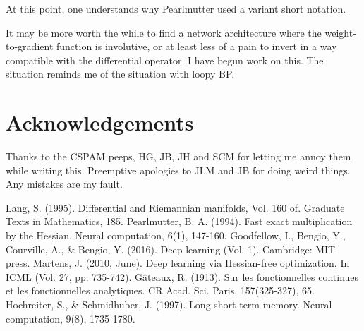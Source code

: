 \documentclass{article}
\begin{document}
At this point, one understands why Pearlmutter used a variant short notation.

It may be more worth the while to find a network architecture where the weight-to-gradient function is involutive, or at least less of a pain to invert in a way compatible with the differential operator. I have begun work on this. The situation reminds me of the situation with loopy BP.

\section{Acknowledgements}

Thanks to the CSPAM peeps, HG, JB, JH and SCM for letting me annoy them while writing this. Preemptive apologies to JLM and JB for doing weird things. Any mistakes are my fault.

\begin{thebibliography}{9}
Lang, S. (1995). Differential and Riemannian manifolds, Vol. 160 of. Graduate Texts in Mathematics, 185.
Pearlmutter, B. A. (1994). Fast exact multiplication by the Hessian. Neural computation, 6(1), 147-160.
Goodfellow, I., Bengio, Y., Courville, A., \& Bengio, Y. (2016). Deep learning (Vol. 1). Cambridge: MIT press.
Martens, J. (2010, June). Deep learning via Hessian-free optimization. In ICML (Vol. 27, pp. 735-742).
G\^{a}teaux, R. (1913). Sur les fonctionnelles continues et les fonctionnelles analytiques. CR Acad. Sci. Paris, 157(325-327), 65.
Hochreiter, S., \& Schmidhuber, J. (1997). Long short-term memory. Neural computation, 9(8), 1735-1780.
\end{thebibliography}
\end{document}
